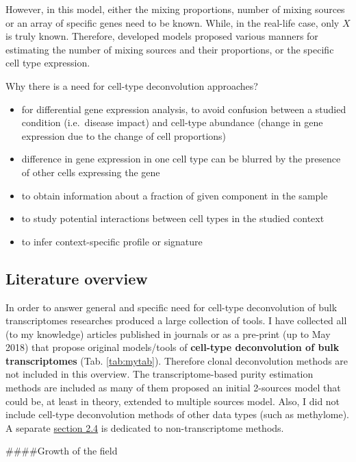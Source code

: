 \documentclass[12pt,]{book}
\providecommand{\tightlist}{%
  \setlength{\itemsep}{0pt}\setlength{\parskip}{0pt}}
\theoremstyle{definition}
\theoremstyle{definition}
\theoremstyle{definition}
\theoremstyle{remark}
\begin{document}
However, in this model, either the mixing proportions, number of mixing
sources or an array of specific genes need to be known. While, in the
real-life case, only \(X\) is truly known. Therefore, developed models
proposed various manners for estimating the number of mixing sources and
their proportions, or the specific cell type expression.

Why there is a need for cell-type deconvolution approaches?

\begin{itemize}
\tightlist
\item
  for differential gene expression analysis, to avoid confusion between
  a studied condition (i.e.~disease impact) and cell-type abundance
  (change in gene expression due to the change of cell proportions)
\item
  difference in gene expression in one cell type can be blurred by the
  presence of other cells expressing the gene
\item
  to obtain information about a fraction of given component in the
  sample
\item
  to study potential interactions between cell types in the studied
  context
\item
  to infer context-specific profile or signature
\end{itemize}

\hypertarget{literature-overview}{%
\subsection{Literature overview}\label{literature-overview}}

In order to answer general and specific need for cell-type deconvolution
of bulk transcriptomes researches produced a large collection of tools.
I have collected all (to my knowledge) articles published in journals or
as a pre-print (up to May 2018) that propose original models/tools of
\textbf{cell-type deconvolution of bulk transcriptomes} (Tab.
\ref{tab:mytab}). Therefore clonal deconvolution methods are not
included in this overview. The transcriptome-based purity estimation
methods are included as many of them proposed an initial 2-sources model
that could be, at least in theory, extended to multiple sources model.
Also, I did not include cell-type deconvolution methods of other data
types (such as methylome). A separate
\protect\hyperlink{otherDecon}{section 2.4} is dedicated to
non-transcriptome methods.

\#\#\#\#Growth of the field
\end{document}
